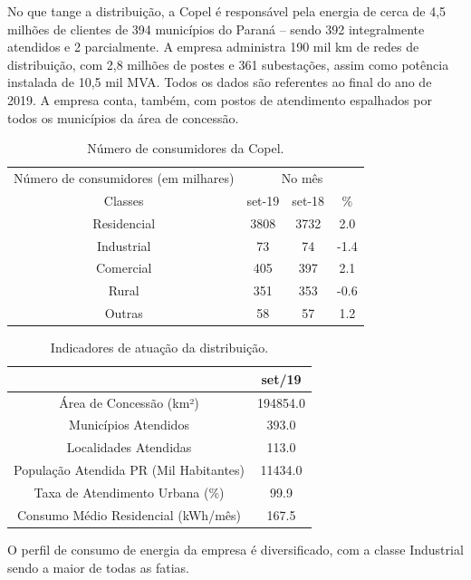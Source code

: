 \documentclass[grad,numbers]{coppe}
\begin{document}
  No que tange a distribuição, a Copel é responsável pela energia de cerca de 4,5 milhões de clientes de 394 municípios do Paraná -- sendo 392 integralmente atendidos e 2 parcialmente. A empresa administra 190 mil km de redes de distribuição, com 2,8 milhões de postes e 361 subestações, assim como potência instalada de 10,5 mil MVA. Todos os dados são referentes ao final do ano de 2019. A empresa conta, também, com postos de atendimento espalhados por todos os municípios da área de concessão.
  \begin{table}[H]

  \caption{\label{tab:unnamed-chunk-9}Número de consumidores da Copel.}
  \centering
  \begin{tabular}[t]{cccc}
  \toprule
  \multicolumn{1}{c}{Número de consumidores (em milhares)} & \multicolumn{3}{c}{No mês} \\
  \cmidrule(l{3pt}r{3pt}){1-1} \cmidrule(l{3pt}r{3pt}){2-4}
  Classes & set-19 & set-18 & \%\\
  \midrule
  Residencial & 3808 & 3732 & 2.0\\
  Industrial & 73 & 74 & -1.4\\
  Comercial & 405 & 397 & 2.1\\
  Rural & 351 & 353 & -0.6\\
  Outras & 58 & 57 & 1.2\\
  \bottomrule
  \end{tabular}
  \end{table}
  \begin{table}[H]

  \caption{\label{tab:unnamed-chunk-10}Indicadores de atuação da distribuição.}
  \centering
  \begin{tabular}[t]{cc}
  \toprule
    & set/19\\
  \midrule
  Área de Concessão (km²) & 194854.0\\
  Municípios Atendidos & 393.0\\
  Localidades Atendidas & 113.0\\
  População Atendida PR (Mil Habitantes) & 11434.0\\
  Taxa de Atendimento Urbana (\%) & 99.9\\
  \addlinespace
  Consumo Médio Residencial (kWh/mês) & 167.5\\
  \bottomrule
  \end{tabular}
  \end{table}
  O perfil de consumo de energia da empresa é diversificado, com a classe Industrial sendo a maior de todas as fatias.
\end{document}
